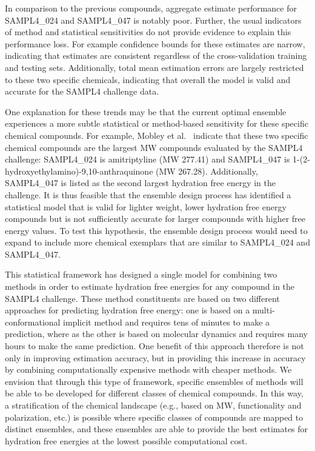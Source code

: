 \documentclass[journal=jpcbfk, manuscript=article]{achemso}
\newcommand{\+}[1]{\ensuremath{\mathbf{#1}}}
\begin{document}
In comparison to the previous compounds, aggregate estimate performance for SAMPL4\_024 and SAMPL4\_047 is notably poor.
Further, the usual indicators of method and statistical sensitivities do not provide evidence to explain this performance loss.
For example confidence bounds for these estimates are narrow, indicating that estimates are consistent regardless of the cross-validation training and testing sets.
Additionally, total mean estimation errors are largely restricted to these two specific chemicals, indicating that overall the model is valid and accurate for the SAMPL4 challenge data. 
 
One explanation for these trends may be that the current optimal ensemble experiences a more subtle statistical or method-based sensitivity for these specific chemical compounds. 
For example, Mobley et al.~\cite{Mobley:2014} indicate that these two specific chemical compounds are the largest MW compounds evaluated by the SAMPL4 challenge: SAMPL4\_024 is amitriptyline (MW 277.41) and SAMPL4\_047 is 1-(2-hydroxyethylamino)-9,10-anthraquinone (MW 267.28).
Additionally, SAMPL4\_047 is listed as the second largest hydration free energy in the challenge.
It is thus feasible that the ensemble design process has identified a statistical model that is valid for lighter weight, lower hydration free energy compounds but is not sufficiently accurate for larger compounds with higher free energy values.
To test this hypothesis, the ensemble design process would need to expand to include more chemical exemplars that are similar to SAMPL4\_024 and SAMPL4\_047. 

This statistical framework has designed a single model for combining two methods in order to estimate hydration free energies for any compound in the SAMPL4 challenge.
These method constituents are based on two different approaches for predicting hydration free energy: one is based on a multi-conformational implicit method and requires tens of minutes to make a prediction, where as the other is based on molecular dynamics and requires many hours to make the same prediction. 
One benefit of this approach therefore is not only in improving estimation accuracy, but in providing this increase in accuracy by combining computationally expensive methods with cheaper methods.
We envision that through this type of framework, specific ensembles of methods will be able to be developed for different classes of chemical compounds.
In this way, a stratification of the chemical landscape (e.g., based on MW, functionality and polarization, etc.) is possible where specific classes of  compounds are mapped to distinct ensembles, and these ensembles are able to provide the best estimates for hydration free energies at the lowest possible computational cost.
\end{document}

